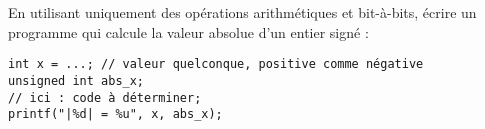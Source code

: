 \documentclass[../../../main.tex]{subfiles}
\begin{document}
En utilisant uniquement des opérations arithmétiques et bit-à-bits, écrire un programme qui calcule la valeur absolue d'un entier signé :
\begin{verbatim}
int x = ...; // valeur quelconque, positive comme négative
unsigned int abs_x;
// ici : code à déterminer;
printf("|%d| = %u", x, abs_x);
\end{verbatim}
\end{document}
